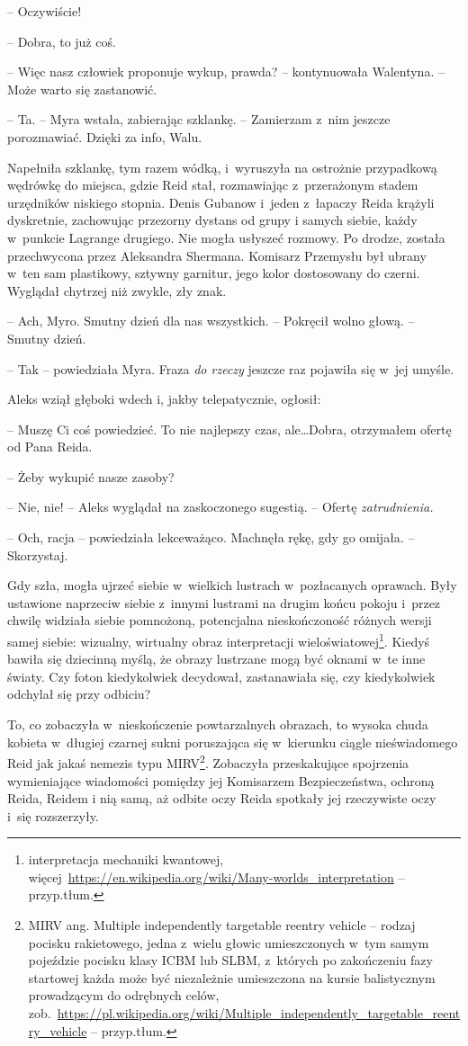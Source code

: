 \documentclass[oneside,polish,11pt,sfheadings]{mwbk}
\begin{document}
-- Oczywiście!

-- Dobra, to już coś.

-- Więc nasz człowiek proponuje wykup, prawda? -- kontynuowała Walentyna.
-- Może warto się zastanowić.

-- Ta. -- Myra wstała, zabierając szklankę. -- Zamierzam z~nim jeszcze
porozmawiać. Dzięki za info, Walu.

Napełniła szklankę, tym razem wódką, i~wyruszyła na ostrożnie
przypadkową wędrówkę do miejsca, gdzie Reid stał, rozmawiając z~przerażonym stadem urzędników niskiego stopnia. Denis Gubanow i~jeden z~łapaczy Reida krążyli dyskretnie, zachowując przezorny dystans od grupy
i samych siebie, każdy w~punkcie Lagrange drugiego. Nie mogła usłyszeć
rozmowy. Po drodze, została przechwycona przez Aleksandra Shermana.
Komisarz Przemysłu był ubrany w~ten sam plastikowy, sztywny garnitur,
jego kolor dostosowany do czerni. Wyglądał chytrzej niż zwykle, zły
znak.

-- Ach, Myro. Smutny dzień dla nas wszystkich. -- Pokręcił wolno głową. -- Smutny dzień.

-- Tak -- powiedziała Myra. Fraza \textit{do rzeczy} jeszcze raz pojawiła
się w~jej umyśle.

Aleks wziął głęboki wdech i, jakby telepatycznie, ogłosił: 

-- Muszę Ci
coś powiedzieć. To nie najlepszy czas, ale\ldots Dobra, otrzymałem ofertę
od Pana Reida.

-- Żeby wykupić nasze zasoby?

-- Nie, nie! -- Aleks wyglądał na zaskoczonego sugestią. -- Ofertę
\textit{zatrudnienia.}

-- Och, racja -- powiedziała lekceważąco. Machnęła rękę, gdy go omijała. -- Skorzystaj.

Gdy szła, mogła ujrzeć siebie w~wielkich lustrach w~pozłacanych
oprawach. Były ustawione naprzeciw siebie z~innymi lustrami na drugim
końcu pokoju i~przez chwilę widziała siebie pomnożoną, potencjalna
nieskończoność różnych wersji samej siebie: wizualny, wirtualny obraz
interpretacji wieloświatowej\footnote{ interpretacja mechaniki kwantowej,
więcej~\url{https://en.wikipedia.org/wiki/Many-worlds\_interpretation}
-- przyp.tłum.}. Kiedyś bawiła się dziecinną myślą, że obrazy lustrzane
mogą być oknami w~te inne światy. Czy foton kiedykolwiek decydował,
zastanawiała się, czy kiedykolwiek odchylał się przy odbiciu?

To, co zobaczyła w~nieskończenie powtarzalnych obrazach, to wysoka chuda
kobieta w~długiej czarnej sukni poruszająca się w~kierunku ciągle
nieświadomego Reid jak jakaś nemezis typu MIRV\footnote{ MIRV ang. Multiple
independently targetable reentry vehicle -- rodzaj pocisku rakietowego,
jedna z~wielu głowic umieszczonych w~tym samym pojeździe pocisku klasy
ICBM lub SLBM, z~których po zakończeniu fazy startowej każda może być
niezależnie umieszczona na kursie balistycznym prowadzącym do odrębnych
celów,
zob.~\url{https://pl.wikipedia.org/wiki/Multiple\_independently\_targetable\_reentry\_vehicle}
-- przyp.tłum.}. Zobaczyła przeskakujące spojrzenia wymieniające
wiadomości pomiędzy jej Komisarzem Bezpieczeństwa, ochroną Reida, Reidem
i nią samą, aż odbite oczy Reida spotkały jej rzeczywiste oczy i~się
rozszerzyły.
\end{document}

